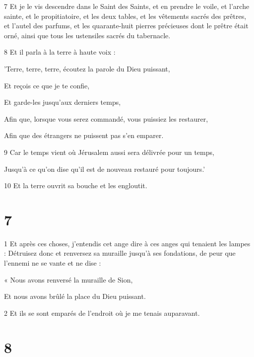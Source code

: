 \par 7 Et je le vis descendre dans le Saint des Saints, et en prendre le voile, et l'arche sainte, et le propitiatoire, et les deux tables, et les vêtements sacrés des prêtres, et l'autel des parfums, et les quarante-huit pierres précieuses dont le prêtre était orné, ainsi que tous les ustensiles sacrés du tabernacle.

\par 8 Et il parla à la terre à haute voix :

\par 'Terre, terre, terre, écoutez la parole du Dieu puissant,

\par Et reçois ce que je te confie,

\par Et garde-les jusqu'aux derniers temps,

\par Afin que, lorsque vous serez commandé, vous puissiez les restaurer,

\par Afin que des étrangers ne puissent pas s'en emparer.

\par 9 Car le temps vient où Jérusalem aussi sera délivrée pour un temps,

\par Jusqu'à ce qu'on dise qu'il est de nouveau restauré pour toujours.'

\par 10 Et la terre ouvrit sa bouche et les engloutit.

\chapter{7}

\par 1 Et après ces choses, j'entendis cet ange dire à ces anges qui tenaient les lampes : Détruisez donc et renversez sa muraille jusqu'à ses fondations, de peur que l'ennemi ne se vante et ne dise :

\par « Nous avons renversé la muraille de Sion,

\par Et nous avons brûlé la place du Dieu puissant.

\par 2 Et ils se sont emparés de l'endroit où je me tenais auparavant.

\chapter{8}

